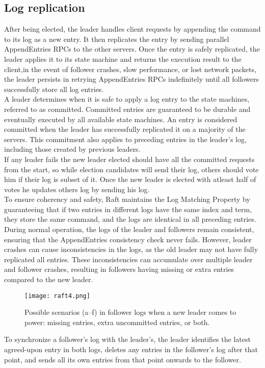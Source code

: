 \documentclass{article}
\begin{document}
\subsection{Log replication}
After being elected, the leader handles client requests by appending the command to its log as a new entry. It then replicates the entry by sending parallel AppendEntries RPCs to the other servers. Once the entry is safely replicated, the leader applies it to its state machine and returns the execution result to the client,in the event of follower crashes, slow performance, or lost network packets, the leader persists in retrying AppendEntries RPCs indefinitely until all followers successfully store all log entries. \\
A leader determines when it is safe to apply a log entry to the state machines, referred to as committed. Committed entries are guaranteed to be durable and eventually executed by all available state machines. An entry is considered committed when the leader has successfully replicated it on a majority of the servers. This commitment also applies to preceding entries in the leader's log, including those created by previous leaders.\\
If any leader fails the new leader elected should have all the committed requests from the start, so while election candidates will send their log, others should vote him if their log is subset of it. Once the new leader is elected with atleast half of votes he updates others log by sending his log. \\
To ensure coherency and safety, Raft maintains the Log Matching Property by guaranteeing that if two entries in different logs have the same index and term, they store the same command, and the logs are identical in all preceding entries. \\
During normal operation, the logs of the leader and followers remain consistent, ensuring that the AppendEntries consistency check never fails. However, leader crashes can cause inconsistencies in the logs, as the old leader may not have fully replicated all entries. These inconsistencies can accumulate over multiple leader and follower crashes, resulting in followers having missing or extra entries compared to the new leader.\\
\begin{figure}[t]
\texttt{[image: raft4.png]}
\centering
\caption{Possible scenarios (a–f) in follower logs when a new leader comes to power: missing entries, extra uncommitted entries, or both.}
\end{figure}
To synchronize a follower's log with the leader's, the leader identifies the latest agreed-upon entry in both logs, deletes any entries in the follower's log after that point, and sends all its own entries from that point onwards to the follower. 
\end{document}
